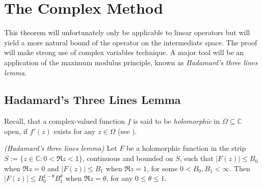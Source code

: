 \section{The Complex Method}
This theorem will unfortunately only be applicable to linear operators but will yield a more natural bound of the operator on the intermediate space. The proof will make strong use of complex variables technique. A major tool will be an application of the maximum modulus principle, known as \emph{Hadamard's three lines lemma}.

\subsection{Hadamard's Three Lines Lemma}
Recall, that a complex-valued function $f$ is said to be \emph{holomorphic}  in $\Omega \subseteq \mathbb{C}$ open, if $f'(z)$ exists for any $z \in \Omega$ (see \cite[197]{rudin:rc_analysis:1987}).
 
\vspace{2mm}

\begin{mdframed}
	\begin{lemma}\emph{(Hadamard's three lines lemma)}
		Let $F$ be a holomorphic function in the strip $S := \{z \in \mathbb{C}: 0 < \Re z < 1\}$, continuous and bounded on $\overline{S}$, such that $\left| F(z)\right| \leqslant B_0$ when $\Re z = 0$ and $\left| F(z) \right| \leqslant B_1$ when $\Re z = 1$, for some $0 < B_0,B_1 < \infty$. Then $\left| F(z) \right| \leqslant B_0^{1 - \theta}B_1^\theta$ when $\Re z = \theta$, for any $0 \leqslant \theta \leqslant 1$.
		\label{lem:HTL}
	\end{lemma}
\end{mdframed}
				
\vspace{2mm}

